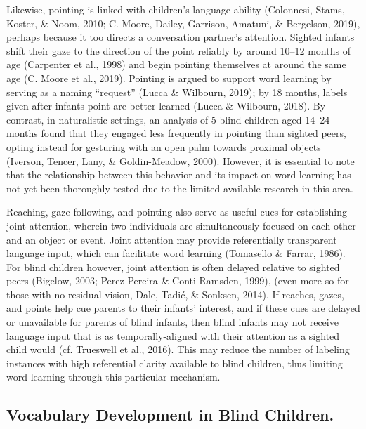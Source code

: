 \documentclass[
  man,floatsintext]{apa6}
\begin{document}
Likewise, pointing is linked with children's language ability (Colonnesi, Stams, Koster, \& Noom, 2010; C. Moore, Dailey, Garrison, Amatuni, \& Bergelson, 2019), perhaps because it too directs a conversation partner's attention. Sighted infants shift their gaze to the direction of the point reliably by around 10--12 months of age (Carpenter et al., 1998) and begin pointing themselves at around the same age (C. Moore et al., 2019). Pointing is argued to support word learning by serving as a naming ``request'' (Lucca \& Wilbourn, 2019); by 18 months, labels given after infants point are better learned (Lucca \& Wilbourn, 2018). By contrast, in naturalistic settings, an analysis of 5 blind children aged 14--24-months found that they engaged less frequently in pointing than sighted peers, opting instead for gesturing with an open palm towards proximal objects (Iverson, Tencer, Lany, \& Goldin-Meadow, 2000). However, it is essential to note that the relationship between this behavior and its impact on word learning has not yet been thoroughly tested due to the limited available research in this area.

Reaching, gaze-following, and pointing also serve as useful cues for establishing joint attention, wherein two individuals are simultaneously focused on each other and an object or event. Joint attention may provide referentially transparent language input, which can facilitate word learning (Tomasello \& Farrar, 1986). For blind children however, joint attention is often delayed relative to sighted peers (Bigelow, 2003; Perez-Pereira \& Conti-Ramsden, 1999), (even more so for those with no residual vision, Dale, Tadić, \& Sonksen, 2014). If reaches, gazes, and points help cue parents to their infants' interest, and if these cues are delayed or unavailable for parents of blind infants, then blind infants may not receive language input that is as temporally-aligned with their attention as a sighted child would (cf. Trueswell et al., 2016). This may reduce the number of labeling instances with high referential clarity available to blind children, thus limiting word learning through this particular mechanism.

\hypertarget{vocabulary-development-in-blind-children.}{%
\subsection{Vocabulary Development in Blind Children.}\label{vocabulary-development-in-blind-children.}}
\end{document}
